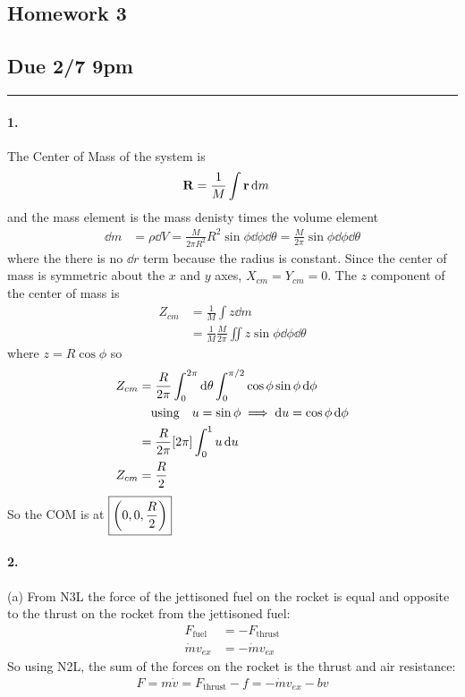 \documentclass[../hw.tex]{subfiles}
\begin{document}
\setcounter{section}{3}
\begin{center}
  \section*{Homework 3} \label{sec:homework3}
  \subsection*{Due 2/7 9pm}
\end{center}
\hrule \vspace{10px}

\paragraph{1.} The Center of Mass of the system is
\begin{align*}
  \vb{R} &= \frac{1}{M} \int \vb{r} \dd{m}
\end{align*}
and the mass element is the mass denisty times the volume element
\begin{align*}
  \dd{m} &= \rho \dd{V} = \frac{M}{2\pi R^2} R^2 \sin\phi \dd{\phi} \dd{\theta}
    = \frac{M}{2\pi} \sin\phi \dd{\phi} \dd{\theta}
\end{align*}
where the there is no $\dd{r}$ term because the radius is constant.
Since the center of mass is symmetric about the $x$ and $y$ axes, $X_{cm} = Y_{cm} = 0$.
The $z$ component of the center of mass is
\begin{align*}
  Z_{cm} &= \frac{1}{M} \int z \dd{m} \\
  &= \frac{1}{M} \frac{M}{2\pi} \iint z \sin\phi \dd{\phi} \dd{\theta}
\end{align*}
where $z = R \cos\phi$ so
\begin{align*}
  Z_{cm} &= \frac{R}{2\pi} \int_0^{2\pi}  \dd{\theta} \int_0^{\pi/2} \cos\phi \sin\phi \dd{\phi}  \\
  &\qusing u = \sin\phi \implies \dd{u} = \cos\phi \dd{\phi} \\
  &= \frac{R}{2\pi} [2\pi] \int_0^1 u \dd{u} \\
  Z_{cm} &= \frac{R}{2}
\end{align*}
So the COM is at $\boxed{\qt(0,0,\frac{R}{2})}$

\newpage
\paragraph*{2.}
(a) From N3L the force of the jettisoned fuel on the rocket is equal and opposite to the thrust 
on the rocket from the jettisoned fuel:
\begin{align*}
  F_{\text{fuel}} &= -F_{\text{thrust}} \\
  \dot m v_{ex} &= -\dot m v_{ex}
\end{align*}
So using N2L, the sum of the forces on the rocket is the thrust and air resistance:
\begin{align*}
  F = m \dot v = F_{\text{thrust}} - f  = - \dot m v_{ex} - bv
\end{align*}
\end{document}
